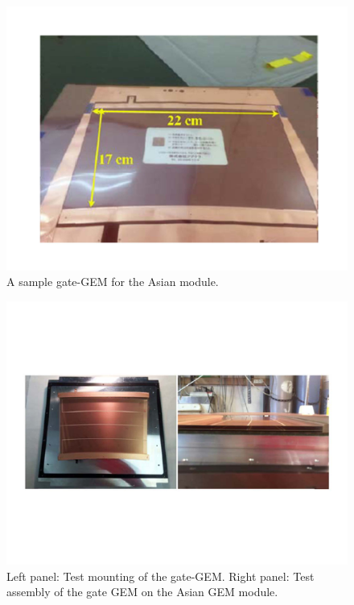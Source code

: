 
\begin{figure}[htb!]
\begin{center}
\includegraphics[width=\columnwidth]{Tracker/TPC_Bonn/plots/TPC-Gate_Fig6gating.pdf}%
\caption{\label{Fig6gating} {A sample gate-GEM for the Asian module.}}
\end{center}
\end{figure}


\begin{figure}[htb!]
\begin{center}
\includegraphics[width=\columnwidth]{Tracker/TPC_Bonn/plots/TPC-Gate_Fig78gating.pdf}%
\caption{\label{Fig78gating} {Left panel: Test mounting of the gate-GEM. Right panel: Test assembly of the gate GEM on the Asian GEM module.}}
\end{center}
\end{figure}


